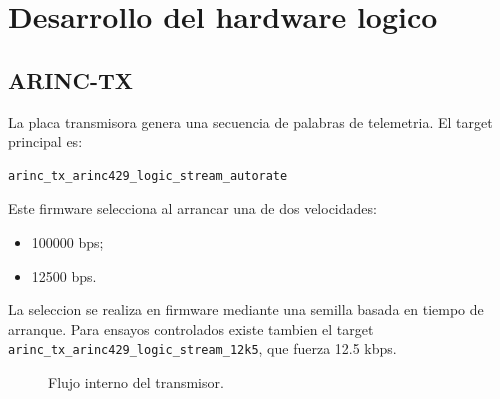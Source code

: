 \documentclass[12pt,a4paper,oneside]{report}
\begin{document}
\chapter{Desarrollo del hardware logico}

\section{ARINC-TX}

La placa transmisora genera una secuencia de palabras de telemetria. El target
principal es:

\begin{lstlisting}
arinc_tx_arinc429_logic_stream_autorate
\end{lstlisting}

Este firmware selecciona al arrancar una de dos velocidades:

\begin{itemize}
  \item 100000 bps;
  \item 12500 bps.
\end{itemize}

La seleccion se realiza en firmware mediante una semilla basada en tiempo de
arranque. Para ensayos controlados existe tambien el target
\texttt{arinc\_tx\_arinc429\_logic\_stream\_12k5}, que fuerza 12.5 kbps.

\begin{figure}[H]
\centering
{}
\caption{Flujo interno del transmisor.}
\end{figure}
\end{document}
